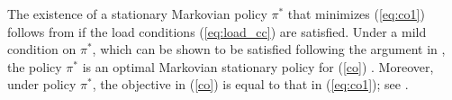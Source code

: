 \documentclass[11pt]{article}
\theoremstyle{definition}
\numberwithin{equation}{section}
\begin{document}
The existence of a stationary Markovian policy $\pi^*$ that minimizes
(\ref{eq:co1}) follows from \cite[Theorem 4.3]{Meyn1997} if the load conditions (\ref{eq:load_cc}) are satisfied. Under a mild
condition on $\pi^*$, which can be shown to be satisfied following the
argument in \cite[Theorem 4.3]{Meyn1997}, the policy $\pi^*$ is an
optimal Markovian stationary policy for (\ref{co}) \cite[Theorem
2.1]{Beutler1987}.  Moreover, under policy $\pi^*$, the objective in
(\ref{co}) is equal to  that in (\ref{eq:co1}); see
\cite[Theorem 3.6]{Beutler1987}.







%
%
%
%
%
\end{document}
